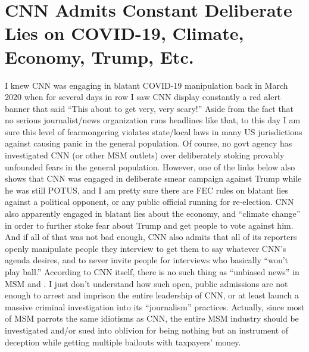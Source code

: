 \chapter{CNN Admits Constant Deliberate Lies on COVID-19, Climate, Economy, Trump, Etc.}

\begin{refsection}

I knew CNN was engaging in blatant COVID-19 manipulation back in March 2020 when for several days in row I saw CNN display constantly a red alert banner that said \enquote{This about to get very, very scary!} Aside from the fact that no serious journalist/news organization runs headlines like that, to this day I am sure this level of fearmongering violates state/local laws in many US jurisdictions against causing panic in the general population. Of course, no govt agency has investigated CNN (or other MSM outlets) over deliberately stoking provably unfounded fears in the general population. However, one of the links below also shows that CNN was engaged in deliberate smear campaign against Trump while he was still POTUS, and I am pretty sure there are FEC rules on blatant lies against a political opponent, or any public official running for re-election. CNN also apparently engaged in blatant lies about the economy, and \enquote{climate change} in order to further stoke fear about Trump and get people to vote against him. And if all of that was not bad enough, CNN also admits that all of its reporters openly manipulate people they interview to get them to say whatever CNN's agenda desires, and to never invite people for interviews who basically \enquote{won't play ball.} According to CNN itself, there is no such thing as \enquote{unbiased news} in MSM and .  I just don't understand how such open, public admissions are not enough to arrest and imprison the entire leadership of CNN, or at least launch a massive criminal investigation into its \enquote{journalism} practices. Actually, since most of MSM parrots the same idiotisms as CNN, the entire MSM industry should be investigated and/or sued into oblivion for being nothing but an instrument of deception while getting multiple bailouts with taxpayers' money.


\end{refsection}
